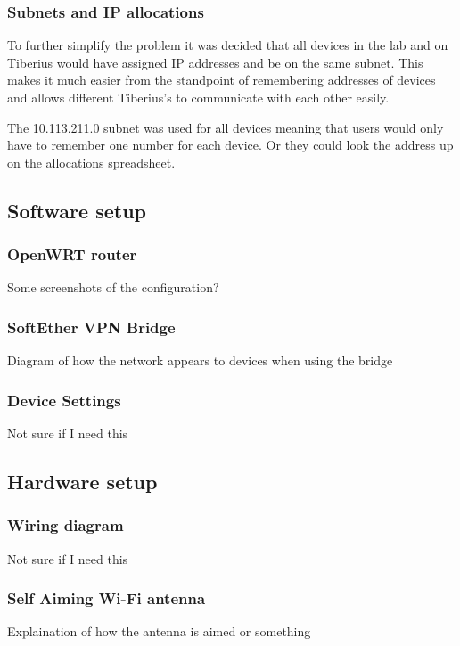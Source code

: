 \subsubsection{Subnets and IP allocations}
To further simplify the problem it was decided that all devices in the lab and on Tiberius would have assigned IP addresses and be on the same subnet. This makes it much easier from the standpoint of remembering addresses of devices and allows different Tiberius's to communicate with each other easily.

The 10.113.211.0 subnet was used for all devices meaning that users would only have to remember one number for each device. Or they could look the address up on the allocations spreadsheet.


\subsection{Software setup}
\subsubsection{OpenWRT router}
Some screenshots of the configuration?
\subsubsection{SoftEther VPN Bridge}
Diagram of how the network appears to devices when using the bridge
\subsubsection{Device Settings}
Not sure if I need this

\subsection{Hardware setup}
\subsubsection{Wiring diagram}
Not sure if I need this
\subsubsection{Self Aiming Wi-Fi antenna}
Explaination of how the antenna is aimed or something



